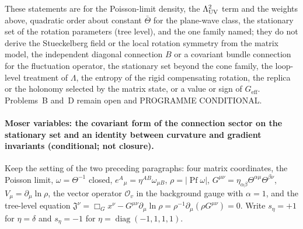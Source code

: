 These statements are for the Poisson-limit density, the \(\Lambda_{\mathrm{UV}}^2\) term and the weights above, quadratic order about constant \(\bar\Theta\) for the plane-wave class, the stationary set of the rotation parameters (tree level), and the one family named; they do not derive the Stueckelberg field or the local rotation symmetry from the matrix model, the independent diagonal connection \(B\) or a covariant bundle connection for the fluctuation operator, the stationary set beyond the cone family, the loop-level treatment of \(\Lambda\), the entropy of the rigid compensating rotation, the replica or the holonomy selected by the matrix state, or a value or sign of \(G_{\mathrm{eff}}\). Problems~B and~D remain open and PROGRAMME CONDITIONAL.

\paragraph{Moser variables: the covariant form of the connection sector on the stationary set and an identity between curvature and gradient invariants (conditional; not closure).}
Keep the setting of the two preceding paragraphs: four matrix coordinates, the Poisson limit, \(\omega=\Theta^{-1}\) closed, \(e^A{}_\mu=\eta^{AB}\omega_{\mu B}\), \(\rho=\lvert\operatorname{Pf}\omega\rvert\), \(G^{\mu\nu}=\eta_{\alpha\beta}\Theta^{\alpha\mu}\Theta^{\beta\nu}\), \(V_\mu=\partial_\mu\ln\rho\), the vector operator \(\mathcal O_v\) in the background gauge with \(\alpha=1\), and the tree-level equation \(\mathfrak J^\nu=\Box_Gx^\nu-G^{\mu\nu}\partial_\mu\ln\rho=\rho^{-1}\partial_\mu(\rho G^{\mu\nu})=0\). Write \(s_\eta=+1\) for \(\eta=\delta\) and \(s_\eta=-1\) for \(\eta=\operatorname{diag}(-1,1,1,1)\).


